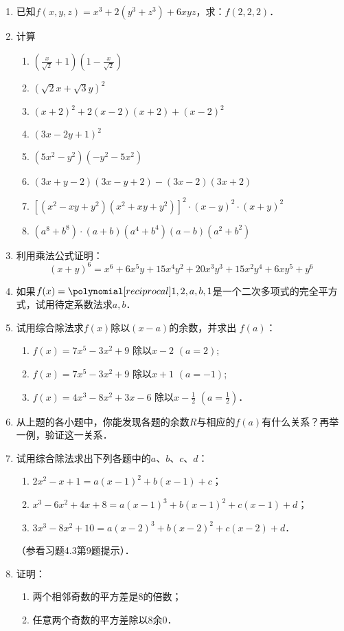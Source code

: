 \begin{enumerate}
\item 已知$f(x,y,z)=x^3+2(y^3+z^3)+6xyz$，求：$f(2,2,2)$．

\item 计算
\begin{enumerate}
    \item $\left(\frac{x}{\sqrt{2}}+1\right)\left(1-\frac{x}{\sqrt{2}}\right)$
    \item $\left(\sqrt{2}x+\sqrt{3}y\right)^2$
    \item $(x+2)^2+2(x-2)(x+2)+(x-2)^2$
    \item $(3x-2y+1)^2$
    \item $(5x^2-y^2)(-y^2-5x^2)$
    \item $(3x+y-2)(3x-y+2)-(3x-2)(3x+2)$
    \item $\left[(x^2-xy+y^2)(x^2+xy+y^2)\right]^2\cdot (x-y)^2\cdot (x+y)^2$
    \item $(a^8+b^8)\cdot (a+b)(a^4+b^4)(a-b)(a^2+b^2)$
\end{enumerate}

\item 利用乘法公式证明：
\[(x+y)^6=x^6+6x^5y+15x^4y^2+20x^3y^3+15x^2y^4+6xy^5+y^6\]
\item 如果$f(x)=\poly{1,2,a,b,1}$是一个二次多项式的完全平方式，试用待定系数法求$a,b$．
\item  试用综合除法求$f(x)$除以$(x-a)$的余数，并求出
$f (a)$：
\begin{enumerate}
    \item $f(x)=7x^5-3x^2+9$ 除以$x-2$ $(a=2)$;
    \item $f(x)=7x^5-3x^2+9$ 除以$x+1$ $(a=-1)$;
    \item $f(x)=4x^3-8x^2+3x-6$ 除以$x-\frac{1}{2}$ $(a=\frac{1}{2})$．
\end{enumerate}

\item 从上题的各小题中，你能发现各题的余数$R$与相应的$f(a)$有什么关系？再举一例，验证这一关系．
\item 试用综合除法求出下列各题中的$a$、$b$、$c$、$d$：
\begin{enumerate}
    \item $2x^2-x+1=a(x-1)^2+b(x-1)+c$；
    \item $x^3-6x^2+4x+8=a(x-1)^3+b(x-1)^2+c(x-1)+d$；
    \item $3x^3-8x^2+10=a(x-2)^3+b(x-2)^2+c(x-2)+d$．
\end{enumerate}
（参看习题4.3第9题提示）．

\item 证明：
\begin{enumerate}
    \item 两个相邻奇数的平方差是8的倍数；
    \item 任意两个奇数的平方差除以8余0．
\end{enumerate}


\end{enumerate}
